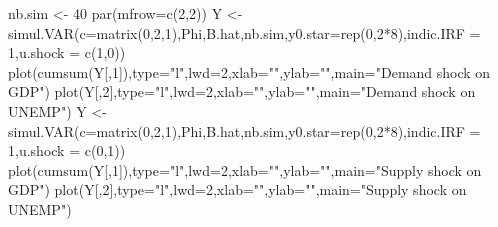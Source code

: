 \documentclass[
  12pt,
]{book}
\newenvironment{Shaded}{\begin{snugshade}}{\end{snugshade}}
\newcommand{\AttributeTok}[1]{\textcolor[rgb]{0.77,0.63,0.00}{#1}}
\newcommand{\DecValTok}[1]{\textcolor[rgb]{0.00,0.00,0.81}{#1}}
\newcommand{\FunctionTok}[1]{\textcolor[rgb]{0.00,0.00,0.00}{#1}}
\newcommand{\NormalTok}[1]{#1}
\newcommand{\OtherTok}[1]{\textcolor[rgb]{0.56,0.35,0.01}{#1}}
\newcommand{\SpecialCharTok}[1]{\textcolor[rgb]{0.00,0.00,0.00}{#1}}
\newcommand{\StringTok}[1]{\textcolor[rgb]{0.31,0.60,0.02}{#1}}
\theoremstyle{definition}
\theoremstyle{definition}
\theoremstyle{definition}
\theoremstyle{definition}
\theoremstyle{remark}
\begin{document}
\begin{Shaded}
\begin{Highlighting}[]
\NormalTok{nb.sim }\OtherTok{\textless{}{-}} \DecValTok{40}
\FunctionTok{par}\NormalTok{(}\AttributeTok{mfrow=}\FunctionTok{c}\NormalTok{(}\DecValTok{2}\NormalTok{,}\DecValTok{2}\NormalTok{))}
\NormalTok{Y }\OtherTok{\textless{}{-}} \FunctionTok{simul.VAR}\NormalTok{(}\AttributeTok{c=}\FunctionTok{matrix}\NormalTok{(}\DecValTok{0}\NormalTok{,}\DecValTok{2}\NormalTok{,}\DecValTok{1}\NormalTok{),Phi,B.hat,nb.sim,}\AttributeTok{y0.star=}\FunctionTok{rep}\NormalTok{(}\DecValTok{0}\NormalTok{,}\DecValTok{2}\SpecialCharTok{*}\DecValTok{8}\NormalTok{),}\AttributeTok{indic.IRF =} \DecValTok{1}\NormalTok{,}\AttributeTok{u.shock =} \FunctionTok{c}\NormalTok{(}\DecValTok{1}\NormalTok{,}\DecValTok{0}\NormalTok{))}
\FunctionTok{plot}\NormalTok{(}\FunctionTok{cumsum}\NormalTok{(Y[,}\DecValTok{1}\NormalTok{]),}\AttributeTok{type=}\StringTok{"l"}\NormalTok{,}\AttributeTok{lwd=}\DecValTok{2}\NormalTok{,}\AttributeTok{xlab=}\StringTok{""}\NormalTok{,}\AttributeTok{ylab=}\StringTok{""}\NormalTok{,}\AttributeTok{main=}\StringTok{"Demand shock on GDP"}\NormalTok{)}
\FunctionTok{plot}\NormalTok{(Y[,}\DecValTok{2}\NormalTok{],}\AttributeTok{type=}\StringTok{"l"}\NormalTok{,}\AttributeTok{lwd=}\DecValTok{2}\NormalTok{,}\AttributeTok{xlab=}\StringTok{""}\NormalTok{,}\AttributeTok{ylab=}\StringTok{""}\NormalTok{,}\AttributeTok{main=}\StringTok{"Demand shock on UNEMP"}\NormalTok{)}
\NormalTok{Y }\OtherTok{\textless{}{-}} \FunctionTok{simul.VAR}\NormalTok{(}\AttributeTok{c=}\FunctionTok{matrix}\NormalTok{(}\DecValTok{0}\NormalTok{,}\DecValTok{2}\NormalTok{,}\DecValTok{1}\NormalTok{),Phi,B.hat,nb.sim,}\AttributeTok{y0.star=}\FunctionTok{rep}\NormalTok{(}\DecValTok{0}\NormalTok{,}\DecValTok{2}\SpecialCharTok{*}\DecValTok{8}\NormalTok{),}\AttributeTok{indic.IRF =} \DecValTok{1}\NormalTok{,}\AttributeTok{u.shock =} \FunctionTok{c}\NormalTok{(}\DecValTok{0}\NormalTok{,}\DecValTok{1}\NormalTok{))}
\FunctionTok{plot}\NormalTok{(}\FunctionTok{cumsum}\NormalTok{(Y[,}\DecValTok{1}\NormalTok{]),}\AttributeTok{type=}\StringTok{"l"}\NormalTok{,}\AttributeTok{lwd=}\DecValTok{2}\NormalTok{,}\AttributeTok{xlab=}\StringTok{""}\NormalTok{,}\AttributeTok{ylab=}\StringTok{""}\NormalTok{,}\AttributeTok{main=}\StringTok{"Supply shock on GDP"}\NormalTok{)}
\FunctionTok{plot}\NormalTok{(Y[,}\DecValTok{2}\NormalTok{],}\AttributeTok{type=}\StringTok{"l"}\NormalTok{,}\AttributeTok{lwd=}\DecValTok{2}\NormalTok{,}\AttributeTok{xlab=}\StringTok{""}\NormalTok{,}\AttributeTok{ylab=}\StringTok{""}\NormalTok{,}\AttributeTok{main=}\StringTok{"Supply shock on UNEMP"}\NormalTok{)}
\end{Highlighting}
\end{Shaded}
\end{document}
